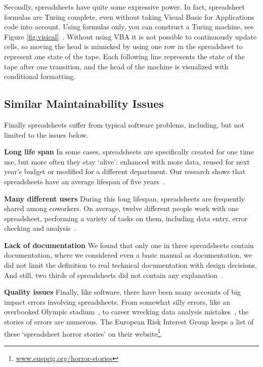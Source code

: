 \documentclass[conference]{IEEEtran}
\begin{document}
Secondly, spreadsheets have quite some expressive power. In fact, spreadsheet formulas are Turing complete, even without taking Visual Basic for Applications code into account. Using formulas only, you can construct a Turing machine, see Figure \ref{fig:visical}~\cite{Turing2013}. Without using VBA it is not possible to continuously update cells, so moving the head is mimicked by using one row in the spreadsheet to represent one state of the tape. Each following line represents the state of the tape after one transition, and the head of the machine is visualized with conditional formatting.

\subsection{Similar Maintainability Issues}

Finally spreadsheets suffer from typical software problems, including, but not limited to the issues below.

\textbf{Long life span} In some cases, spreadsheets are specifically created for one time use, but more often they stay `alive': enhanced with more data, reused for next year's budget or modified for a different department. Our research shows that spreadsheets have an average lifespan of five years~\cite{hermans_supporting_2011}.

\textbf{Many different users} During this long lifespan, spreadsheets are frequently shared among coworkers. On average, twelve different people work with one spreadsheet, performing a variety of tasks on them, including data entry, error checking and analysis~\cite{hermans_supporting_2011}.

\textbf{Lack of documentation} We found that only one in three spreadsheets contain documentation, where we considered even a basic manual as documentation, we did not limit the definition to real technical documentation with design decisions. And still, two thirds of spreadsheets did not contain any explanation~\cite{hermans_supporting_2011}.

\textbf{Quality issues} Finally, like software, there have been many accounts of big impact errors involving spreadsheets. From somewhat silly errors, like an overbooked Olympic stadium~\cite{Kelso2012}, to career wrecking data analysis mistakes~\cite{Herndon2014}, the stories of errors are numerous. The European Risk Interest Group keeps a list of these ‘spreadsheet horror stories’ on their website\footnote{\url{www.eusprig.org/horror-stories}}.
\end{document}
